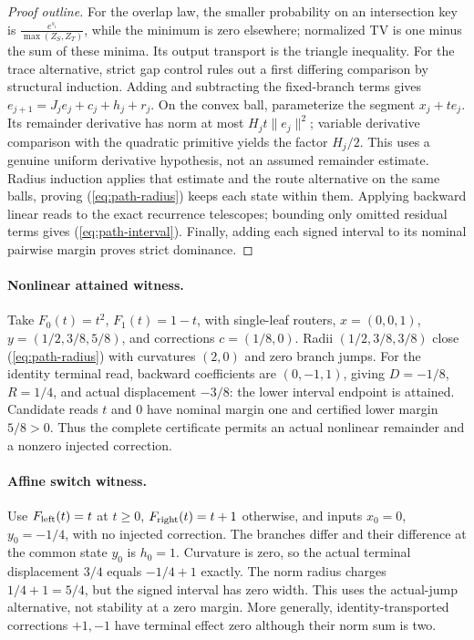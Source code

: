 \documentclass[11pt]{article}
\numberwithin{equation}{section}
\begin{document}
\begin{proof}[Proof outline]
For the overlap law, the smaller probability on an intersection key is
$\frac{e^{s_i}}{\max(Z_S,Z_T)}$, while the minimum is zero elsewhere; normalized TV is one minus the sum of
these minima. Its output transport is the triangle inequality. For the trace alternative, strict gap
control rules out a first differing comparison by structural induction. Adding and subtracting the
fixed-branch terms gives $e_{j+1}=J_je_j+c_j+h_j+r_j$. On the convex ball, parameterize the segment
$x_j+t e_j$. Its remainder derivative has norm at most $H_jt\|e_j\|^2$; variable derivative comparison
with the quadratic primitive yields the factor $H_j/2$. This uses a genuine uniform derivative
hypothesis, not an assumed remainder estimate. Radius induction applies that estimate and the route
alternative on the same balls, proving (\ref{eq:path-radius}) keeps each state within them. Applying
backward linear reads to the exact recurrence telescopes; bounding only omitted residual terms gives
(\ref{eq:path-interval}). Finally, adding each signed interval to its nominal pairwise margin proves
strict dominance.
\end{proof}

\paragraph{Nonlinear attained witness.}
Take $F_0(t)=t^2$, $F_1(t)=1-t$, with single-leaf routers, $x=(0,0,1)$, $y=(1/2,3/8,5/8)$, and
corrections $c=(1/8,0)$. Radii $(1/2,3/8,3/8)$ close (\ref{eq:path-radius}) with curvatures $(2,0)$
and zero branch jumps. For the identity terminal read, backward coefficients are $(0,-1,1)$, giving
$D=-1/8$, $R=1/4$, and actual displacement $-3/8$: the lower interval endpoint is attained. Candidate
reads $t$ and $0$ have nominal margin one and certified lower margin $5/8>0$. Thus the complete
certificate permits an actual nonlinear remainder and a nonzero injected correction.

\paragraph{Affine switch witness.}
Use $F_{\rm left}(t)=t$ at $t\ge0$, $F_{\rm right}(t)=t+1$ otherwise, and inputs $x_0=0$,
$y_0=-1/4$, with no injected correction. The branches differ and their difference at the common state
$y_0$ is $h_0=1$. Curvature is zero, so the actual terminal displacement $3/4$ equals $-1/4+1$ exactly.
The norm radius charges $1/4+1=5/4$, but the signed interval has zero width. This uses the actual-jump
alternative, not stability at a zero margin. More generally, identity-transported corrections $+1,-1$
have terminal effect zero although their norm sum is two.
\end{document}
